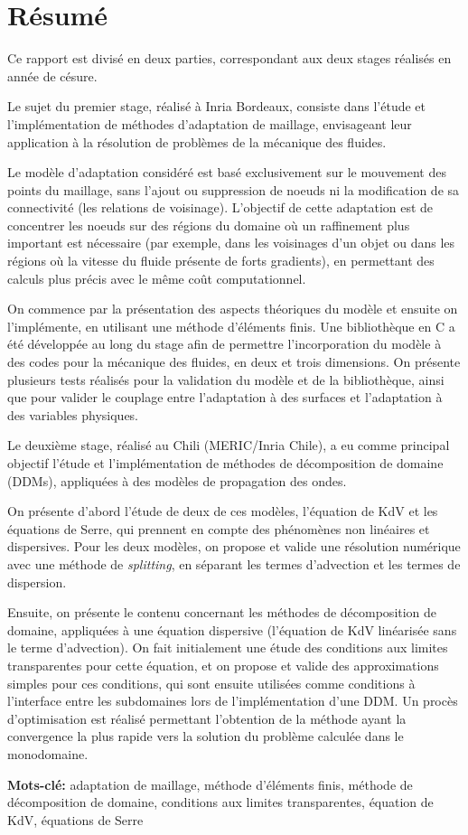 \section*{Résumé}

\indent Ce rapport est divisé en deux parties, correspondant aux deux stages réalisés en année de césure.

\indent Le sujet du premier stage, réalisé à Inria Bordeaux, consiste dans l'étude et l'implémentation de méthodes d'adaptation de maillage, envisageant leur application à la résolution de problèmes de la mécanique des fluides.

\indent Le modèle d'adaptation considéré est basé exclusivement sur le mouvement des points du maillage, sans l'ajout ou suppression de noeuds ni la modification de sa connectivité (les relations de voisinage). L'objectif de cette adaptation est de concentrer les noeuds sur des régions du domaine où un raffinement plus important est nécessaire (par exemple, dans les voisinages d'un objet ou dans les régions où la vitesse du fluide présente de forts gradients), en permettant des calculs plus précis avec le même coût computationnel.

\indent On commence par la présentation des aspects théoriques du modèle et ensuite on l'implémente, en utilisant une méthode d'éléments finis. Une bibliothèque en C a été développée au long du stage afin de permettre l'incorporation du modèle à des codes pour la mécanique des fluides, en deux et trois dimensions. On présente plusieurs tests réalisés pour la validation du modèle et de la bibliothèque, ainsi que pour valider le couplage entre l'adaptation à des surfaces et l'adaptation à des variables physiques.

\indent Le deuxième stage, réalisé au Chili (MERIC/Inria Chile), a eu comme principal objectif l'étude et l'implémentation de méthodes de décomposition de domaine (DDMs), appliquées à des modèles de propagation des ondes.

\indent On présente d'abord l'étude de deux de ces modèles, l'équation de KdV et les équations de Serre, qui prennent en compte des phénomènes non linéaires et dispersives. Pour les deux modèles, on propose et valide une résolution numérique avec une méthode de \emph{splitting}, en séparant les termes d'advection et les termes de dispersion.

\indent Ensuite, on présente le contenu concernant les méthodes de décomposition de domaine, appliquées à une équation dispersive (l'équation de KdV linéarisée sans le terme d'advection). On fait initialement une étude des conditions aux limites transparentes pour cette équation, et on propose et valide des approximations simples pour ces conditions, qui sont ensuite utilisées comme conditions à l'interface entre les subdomaines lors de l'implémentation d'une DDM. Un procès d'optimisation est réalisé permettant l'obtention de la méthode ayant la convergence la plus rapide vers la solution du problème calculée dans le monodomaine.

\indent \textbf{Mots-clé:} adaptation de maillage, méthode d'éléments finis, méthode de décomposition de domaine, conditions aux limites transparentes, équation de KdV, équations de Serre
